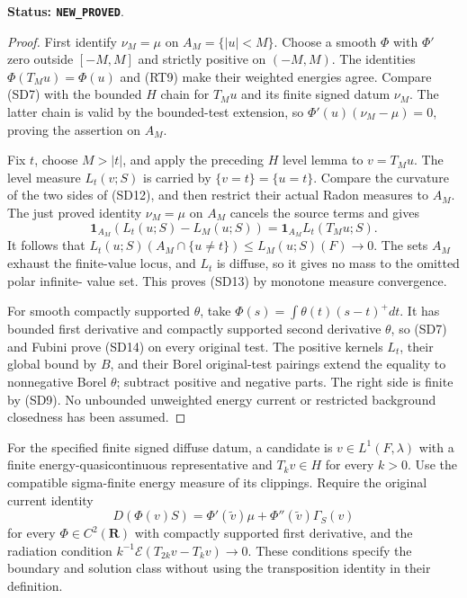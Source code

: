 \noindent\textbf{Status: \texttt{NEW\_PROVED}}.

\begin{proof}
First identify $\nu_M=\mu$ on $A_M=\{|u|<M\}$.
Choose a smooth $\Phi$ with $\Phi'$ zero outside $[-M,M]$
and strictly positive on $(-M,M)$.
The identities $\Phi(T_Mu)=\Phi(u)$ and (RT9) make their
weighted energies agree.  Compare (SD7) with the bounded
$H$ chain for $T_Mu$ and its finite signed datum $\nu_M$.
The latter chain is valid by the bounded-test extension,
so $\Phi'(u)(\nu_M-\mu)=0$, proving the assertion on $A_M$.

Fix $t$, choose $M>|t|$, and apply the preceding $H$ level
lemma to $v=T_Mu$.  The level measure $L_t(v;S)$ is carried
by $\{v=t\}=\{u=t\}$.
Compare the curvature of the two sides of (SD12), and then
restrict their actual Radon measures to $A_M$.
The just proved identity $\nu_M=\mu$ on $A_M$ cancels the
source terms and gives
\[
     \mathbf1_{A_M}(L_t(u;S)-L_M(u;S))
                         =\mathbf1_{A_M}L_t(T_Mu;S).
\]
It follows that
$L_t(u;S)(A_M\cap\{u\ne t\})\le L_M(u;S)(F)\to0$.
The sets $A_M$ exhaust the finite-value locus, and $L_t$ is
diffuse, so it gives no mass to the omitted polar infinite-
value set.  This proves (SD13) by monotone measure convergence.

For smooth compactly supported $\theta$, take
$\Phi(s)=\int\theta(t)(s-t)^+dt$.
It has bounded first derivative and compactly supported
second derivative $\theta$, so (SD7) and Fubini prove
(SD14) on every original test.
The positive kernels $L_t$, their global bound by $B$,
and their Borel original-test pairings extend the equality
to nonnegative Borel $\theta$; subtract positive and negative
parts.  The right side is finite by (SD9).
No unbounded unweighted energy current or restricted
background closedness has been assumed.
\end{proof}

\begin{definition}
\label{def:r11-signed-renormalized-boundary}
For the specified finite signed diffuse datum, a candidate is
$v\in L^1(F,\lambda)$ with a finite energy-quasicontinuous
representative and $T_kv\in H$ for every $k>0$.
Use the compatible sigma-finite energy measure of its
clippings.  Require the original current identity
\[
 D(\Phi(v)S)=\Phi'(\widetilde v)\mu
                     +\Phi''(\widetilde v)\Gamma_S(v)
 \tag{SD15}
\]
for every $\Phi\in C^2(\mathbf R)$ with compactly supported
first derivative, and the radiation condition
$k^{-1}\mathcal E(T_{2k}v-T_kv)\to0$.
These conditions specify the boundary and solution class
without using the transposition identity in their definition.
\end{definition}

